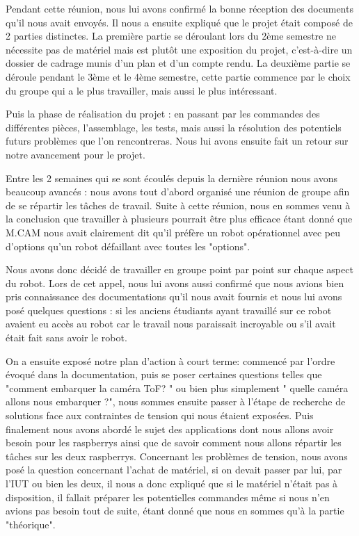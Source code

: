 \documentclass{PackagerQualityN}
\begin{document}
Pendant cette réunion, nous lui avons confirmé la bonne réception des documents qu'il nous avait envoyés.
Il nous a ensuite expliqué que le projet était composé de 2 parties distinctes.
La première partie se déroulant lors du 2ème semestre ne nécessite pas de matériel mais est plutôt
une exposition du projet, c'est-à-dire un dossier de cadrage munis d'un plan et d'un compte rendu.
La deuxième partie se déroule pendant le 3ème et le 4ème semestre, cette partie commence par le
choix du groupe qui a le plus travailler, mais aussi le plus intéressant.


Puis la phase de réalisation du projet : en passant par les commandes des différentes pièces,
l'assemblage, les tests, mais aussi la résolution des potentiels futurs problèmes que l'on rencontreras.
Nous lui avons ensuite fait un retour sur notre avancement pour le projet.


Entre les 2 semaines qui se sont écoulés depuis la dernière réunion nous avons beaucoup avancés :
nous avons tout d'abord organisé une réunion de groupe afin de se répartir les tâches de travail.
Suite à cette réunion, nous en sommes venu à la conclusion que travailler à plusieurs pourrait être
plus efficace étant donné que M.CAM nous avait clairement dit qu'il préfère un robot opérationnel
avec peu d'options qu'un robot défaillant avec toutes les "options".


Nous avons donc décidé de travailler en groupe point par point sur chaque aspect du robot.
Lors de cet appel, nous lui avons aussi confirmé que nous avions bien pris connaissance des
documentations qu'il nous avait fournis et nous lui avons posé quelques questions : si les anciens
étudiants ayant travaillé sur ce robot avaient eu accès au robot car le travail nous paraissait
incroyable ou s'il avait était fait sans avoir le robot.


On a ensuite exposé notre plan d'action à court terme: commencé par l'ordre évoqué dans la
documentation, puis se poser certaines questions telles que "comment embarquer la caméra ToF? "
ou bien plus simplement " quelle caméra allons nous embarquer ?", nous sommes ensuite passer à
l'étape de recherche de solutions face aux contraintes de tension qui nous étaient exposées. Puis
finalement nous avons abordé le sujet des applications dont nous allons avoir besoin pour les
raspberrys ainsi que de savoir comment nous allons répartir les tâches sur les deux raspberrys.
Concernant les problèmes de tension, nous avons posé la question concernant l'achat de matériel, si
on devait passer par lui, par l'IUT ou bien les deux, il nous a donc expliqué que si le matériel n'était
pas à disposition, il fallait préparer les potentielles commandes même si nous n'en avions pas besoin
tout de suite, étant donné que nous en sommes qu'à la partie "théorique".
\end{document}
